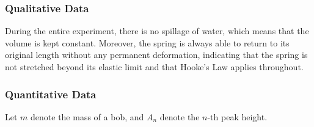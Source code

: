 \documentclass[a4paper,12pt]{article}
\begin{document}
\subsubsection{Qualitative Data}
During the entire experiment, there is no spillage of water, which means that the volume is kept constant. Moreover, the spring is always able to return to its original length without any permanent deformation, indicating that the spring is not stretched beyond its elastic limit and that Hooke's Law applies throughout.

\subsubsection{Quantitative Data}

Let $m$ denote the mass of a bob, and $A_n$ denote the $n$-th peak height.
\end{document}
